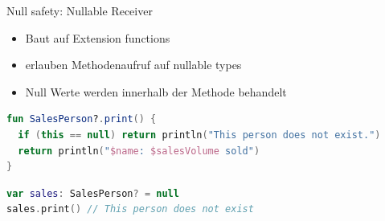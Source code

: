 \documentclass{beamer}
\begin{document}
\begin{frame}[fragile]{Null safety: Nullable Receiver}
  \begin{itemize}[<+->]
    \item Baut auf Extension functions
    \item erlauben Methodenaufruf auf nullable types
    \item Null Werte werden innerhalb der Methode behandelt
  \end{itemize}
  \pause \vspace{1cm}
  \begin{lstlisting}[language=Kotlin]
fun SalesPerson?.print() {
  if (this == null) return println("This person does not exist.")
  return println("$name: $salesVolume sold")
}
  \end{lstlisting}
  \pause
  \begin{lstlisting}[language=Kotlin]
var sales: SalesPerson? = null
sales.print() // This person does not exist
  \end{lstlisting}
\end{frame}
\end{document}
